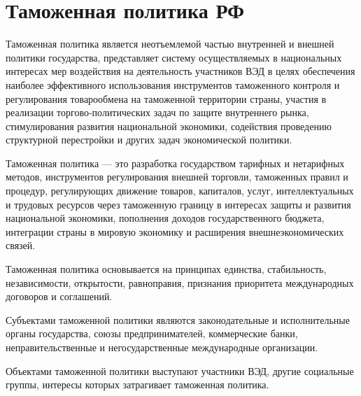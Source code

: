 \section{Таможенная политика РФ}

Таможенная политика является неотъемлемой частью внутренней и внешней политики государства, представляет систему осуществляемых в национальных интересах мер воздействия на деятельность участников ВЭД в целях обеспечения наиболее эффективного использования инструментов таможенного контроля и регулирования товарообмена на таможенной территории страны, участия в реализации торгово-политических задач по защите внутреннего рынка, стимулирования развития национальной экономики, содействия проведению структурной перестройки и других задач экономической политики.

Таможенная политика --- это разработка государством тарифных и нетарифных методов, инструментов регулирования внешней торговли, таможенных правил и процедур, регулирующих движение товаров, капиталов, услуг, интеллектуальных и трудовых ресурсов через таможенную границу в интересах защиты и развития национальной экономики, пополнения доходов государственного бюджета, интеграции страны в мировую экономику и расширения внешнеэкономических связей.

Таможенная политика основывается на принципах единства, стабильность, независимости, открытости, равноправия, признания приоритета международных договоров и соглашений.

Субъектами таможенной политики являются законодательные и исполнительные органы государства, союзы предпринимателей, коммерческие банки, неправительственные и негосударственные международные организации.

Объектами таможенной политики выступают участники ВЭД, другие социальные группы, интересы которых затрагивает таможенная политика.


















